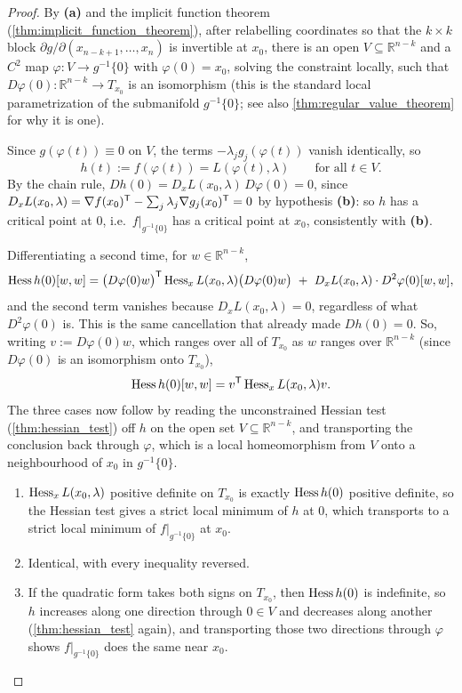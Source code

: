 \begin{proof}
By \textbf{(a)} and the implicit function theorem (\cref{thm:implicit_function_theorem}), after
relabelling coordinates so that the $k\times k$ block $\partial g/\partial(x_{n-k+1},\dots,x_n)$
is invertible at $x_0$, there is an open $V \subseteq \mathbb{R}^{n-k}$ and a $C^2$ map
$\varphi : V \to g^{-1}\{0\}$ with $\varphi(0) = x_0$, solving the constraint locally, such that
$D\varphi(0) : \mathbb{R}^{n-k} \to T_{x_0}$ is an isomorphism (this is the standard local
parametrization of the submanifold $g^{-1}\{0\}$; see also
\cref{thm:regular_value_theorem} for why it is one).

Since $g(\varphi(t)) \equiv 0$ on $V$, the terms $-\lambda_jg_j(\varphi(t))$ vanish identically,
so
\[h(t) := f(\varphi(t)) = L(\varphi(t),\lambda) \qquad \text{for all } t \in V.\]
By the chain rule, $Dh(0) = D_xL(x_0,\lambda)\,D\varphi(0) = 0$, since
$D_xL(x_0,\lambda) = \nabla f(x_0)^{\mathsf{T}} - \sum_j\lambda_j\nabla g_j(x_0)^{\mathsf{T}} = 0$ by
hypothesis \textbf{(b)}: so $h$ has a critical point at $0$, i.e.\ $f|_{g^{-1}\{0\}}$ has a
critical point at $x_0$, consistently with \textbf{(b)}.

Differentiating a second time, for $w \in \mathbb{R}^{n-k}$,
\[\operatorname{Hess} h(0)[w,w] = \big(D\varphi(0)w\big)^{\mathsf{T}}\operatorname{Hess}_xL(x_0,\lambda)\big(D\varphi(0)w\big)
  \ +\ D_xL(x_0,\lambda)\cdot D^2\varphi(0)[w,w],\]
and the second term vanishes because $D_xL(x_0,\lambda)=0$, regardless of what
$D^2\varphi(0)$ is. This is the same cancellation that already made $Dh(0)=0$. So, writing
$v := D\varphi(0)w$, which ranges over all of $T_{x_0}$ as $w$ ranges over $\mathbb{R}^{n-k}$
(since $D\varphi(0)$ is an isomorphism onto $T_{x_0}$),
\[\operatorname{Hess} h(0)[w,w] = v^{\mathsf{T}}\operatorname{Hess}_xL(x_0,\lambda)v.\]
The three cases now follow by reading the unconstrained Hessian test (\cref{thm:hessian_test})
off $h$ on the open set $V \subseteq \mathbb{R}^{n-k}$, and transporting the conclusion back
through $\varphi$, which is a local homeomorphism from $V$ onto a neighbourhood of $x_0$ in
$g^{-1}\{0\}$.
\begin{enumerate}[label=\textbf{(\alph*)}]
  \item $\operatorname{Hess}_xL(x_0,\lambda)$ positive definite on $T_{x_0}$ is exactly $\operatorname{Hess} h(0)$ positive
    definite, so the Hessian test gives a strict local minimum of $h$ at $0$, which transports
    to a strict local minimum of $f|_{g^{-1}\{0\}}$ at $x_0$.
  \item Identical, with every inequality reversed.
  \item If the quadratic form takes both signs on $T_{x_0}$, then $\operatorname{Hess} h(0)$ is indefinite, so
    $h$ increases along one direction through $0 \in V$ and decreases along another
    (\cref{thm:hessian_test} again), and transporting those two directions through $\varphi$
    shows $f|_{g^{-1}\{0\}}$ does the same near $x_0$.
\end{enumerate}
\end{proof}

